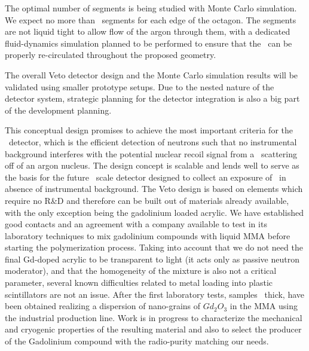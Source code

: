 The optimal number of segments is being studied with Monte Carlo simulation. We expect no more than \DSkVetoMaxSectorPerSide\ segments for each edge of the octagon. The segments are not liquid tight to allow flow of the argon through them, with a dedicated fluid-dynamics simulation planned to be performed to ensure that the \LAr\ can be properly re-circulated throughout the proposed geometry.

The overall Veto detector design and the Monte Carlo simulation results will be validated using smaller prototype setups.  Due to the nested nature of the detector system, strategic planning for the detector integration is also a big part of the development planning.

This conceptual design promises to achieve the most important criteria for the \DSks\ detector, which is the efficient detection of neutrons such that no instrumental background interferes with the potential nuclear recoil signal from a \WIMP\ scattering off of an argon nucleus.   The design concept is scalable and lends well to serve as the basis for the future \ArgoTotalMass\ scale detector designed to collect an exposure of \ArgoExposure\ in absence of instrumental background. The Veto design is based on elements which require no R\&D and therefore can be built out of materials already available, with the only exception being the gadolinium loaded acrylic. We have established good contacts and an agreement with a company available to test in its laboratory techniques to mix gadolinium compounds with liquid MMA before starting the polymerization process. Taking into account that we do not need  the final Gd-doped acrylic to be transparent to light (it acts only as passive neutron moderator), and that the homogeneity of the mixture is also not a critical parameter, several known difficulties related to metal loading into plastic scintillators are not an issue.
After the first laboratory tests, samples \DSkVetoGdAsSheetThickness\ thick, have been obtained realizing a dispersion of nano-grains of $Gd_2O_3$ in the MMA using the industrial production line.
Work is in progress to characterize the mechanical and cryogenic properties of the resulting material and also to select the producer of the Gadolinium compound with the radio-purity 
matching our needs.


